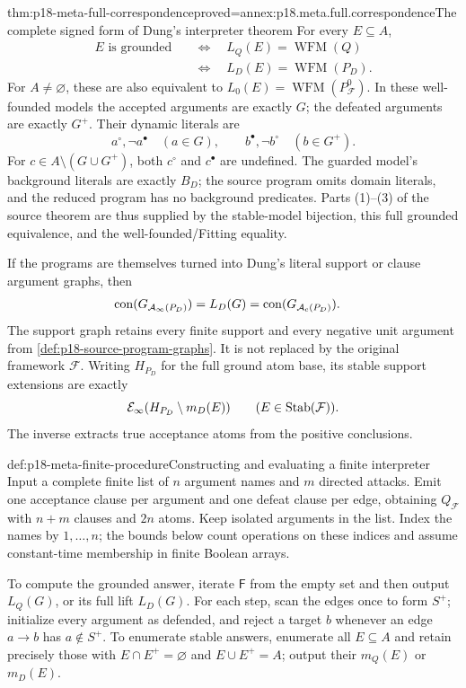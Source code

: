 \begin{hbtheorem}{thm:p18-meta-full-correspondence}{proved=annex:p18.meta.full.correspondence}{The complete signed form of Dung's interpreter theorem}
For every \(E\subseteq A\),
\[
\begin{aligned}
 E\text{ is grounded}
 &\quad\Longleftrightarrow\quad L_Q(E)=\operatorname{WFM}(Q)\\
 &\quad\Longleftrightarrow\quad L_D(E)=\operatorname{WFM}(P_D).
\end{aligned}
\]
For \(A\ne\varnothing\), these are also equivalent to
\(L_0(E)=\operatorname{WFM}(P^0_{\mathcal F})\).
In these well-founded models the accepted arguments are exactly \(G\);
the defeated arguments are exactly \(G^+\). Their dynamic literals are
\[
       a^\circ,\neg a^\bullet\quad(a\in G),\qquad
       b^\bullet,\neg b^\circ\quad(b\in G^+).
\]
For \(c\in A\setminus(G\cup G^+)\), both \(c^\circ\) and
\(c^\bullet\) are undefined. The guarded model's background
literals are exactly \(B_D\); the source program omits domain
literals, and the reduced program has no background predicates.
Parts (1)--(3) of the source theorem are thus supplied by the
stable-model bijection, this full grounded equivalence, and
the well-founded/Fitting equality.

If the programs are themselves turned into Dung's literal
support or clause argument graphs, then
\[
\begin{aligned}
 \operatorname{con}(G_{\mathcal A_\infty(P_D)})
  &=L_D(G)
   =\operatorname{con}(G_{\mathcal A_{\rm c}(P_D)}).
\end{aligned}
\]
The support graph retains every finite support and every negative
unit argument from \cref{def:p18-source-program-graphs}.
It is not replaced by the original framework \(\mathcal F\).
Writing \(H_{P_D}\) for the full ground atom base, its stable
support extensions are exactly
\[
       {\cal E}_\infty(H_{P_D}\setminus m_D(E))
                         \qquad(E\in\operatorname{Stab}(\mathcal F)).
\]
The inverse extracts true acceptance atoms from the positive conclusions.
\end{hbtheorem}

\begin{hbmethod}{def:p18-meta-finite-procedure}{Constructing and evaluating a finite interpreter}
Input a complete finite list of \(n\) argument names and \(m\)
directed attacks. Emit one acceptance clause per argument and
one defeat clause per edge, obtaining \(Q_{\mathcal F}\) with
\(n+m\) clauses and \(2n\) atoms. Keep isolated arguments in the list.
Index the names by \(1,\ldots,n\); the bounds below count operations
on these indices and assume constant-time membership in finite Boolean arrays.

To compute the grounded answer, iterate \(\mathsf F\) from the empty
set and then output \(L_Q(G)\), or its full lift \(L_D(G)\).
For each step, scan the edges once to form \(S^+\); initialize
every argument as defended, and reject a target \(b\) whenever
an edge \(a\to b\) has \(a\notin S^+\).
To enumerate stable answers, enumerate all \(E\subseteq A\)
and retain precisely those with \(E\cap E^+=\varnothing\)
and \(E\cup E^+=A\); output their \(m_Q(E)\) or \(m_D(E)\).
\end{hbmethod}

